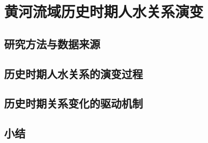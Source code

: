 \chapter{黄河流域历史时期人\textendash{}水关系演变}\label{cha:3}


\section{研究方法与数据来源}\label{ch3:methods}



\section{历史时期人\textendash{}水关系的演变过程}\label{ch3:process}


\section{历史时期关系变化的驱动机制}\label{ch3:mechanism}





\section{小结}\label{ch3:summary}

